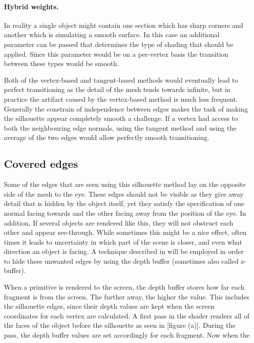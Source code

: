 \documentclass[a4paper, 12pt]{article}
\begin{document}
\paragraph{Hybrid weights.}
In reality a single object might contain one section which has sharp corners and another which is simulating a smooth surface. In this case an additional parameter can be passed that determines the type of shading that should be applied. Since this parameter would be on a per-vertex basis the transition between these types would be smooth.

Both of the vertex-based and tangent-based methods would eventually lead to perfect transitioning as the detail of the mesh tends towards infinite, but in practice the artifact caused by the vertex-based method is much less frequent. Generally the constrain of independence between edges makes the task of making the silhouette appear completely smooth a challenge. If a vertex had access to both the neighbouring edge normals, using the tangent method and using the average of the two edges would allow perfectly smooth transitioning.


\subsection{Covered edges}
Some of the edges that are seen using this silhouette method lay on the opposite side of the mesh to the eye. These edges should not be visible as they give away detail that is hidden by the object itself, yet they satisfy the specification of one normal facing towards and the other facing away from the position of the eye. In addition, If several objects are rendered like this, they will not obstruct each other and appear see-through. While sometimes this might be a nice effect, often times it leads to uncertainty in which part of the scene is closer, and even what direction an object is facing. A technique described in \cite{Rossignac1992} will be employed in order to hide these unwanted edges by using the depth buffer (sometimes also called z-buffer).

When a primitive is rendered to the screen, the depth buffer stores how far each fragment is from the screen. The further away, the higher the value. This includes the silhouette edges, since their depth values are kept when the screen coordinates for each vertex are calculated. A first pass in the shader renders all of the faces of the object before the silhouette as seen in [figure (a)]. During the pass, the depth buffer values are set accordingly for each fragment. Now when the silhouette as in [figure (b)] is drawn in a second pass, a depth test is applied. Silhouette edges that are behind an object will have a higher depth value than the one stored by the previous pass, and will not be rendered, leading to the result shown in [figure (c)].
\end{document}
